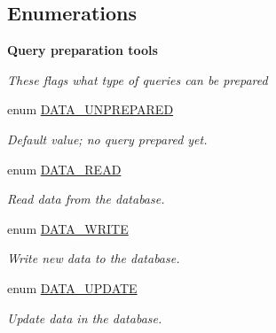 \subsection*{Enumerations}
\begin{Indent}{\bf Query preparation tools}\par
{\em These flags what type of queries can be prepared }\begin{CompactItemize}
\item 
enum \hyperlink{class_8datahandler_8php_21c8184f96d445f8f608321e0e8fffc9}{DATA\_\-UNPREPARED} 
\begin{CompactList}\small\item\em Default value; no query prepared yet. \item\end{CompactList}\item 
enum \hyperlink{class_8datahandler_8php_c28f74b49007773d24ca2207baac6d32}{DATA\_\-READ} 
\begin{CompactList}\small\item\em Read data from the database. \item\end{CompactList}\item 
enum \hyperlink{class_8datahandler_8php_5d8b54a2eb4767a05a2e577c2db9193a}{DATA\_\-WRITE} 
\begin{CompactList}\small\item\em Write new data to the database. \item\end{CompactList}\item 
enum \hyperlink{class_8datahandler_8php_9a817a8e9190bfc1eb884f9b4c3cb7c8}{DATA\_\-UPDATE} 
\begin{CompactList}\small\item\em Update data in the database. \item\end{CompactList}\end{CompactItemize}
\end{Indent}

